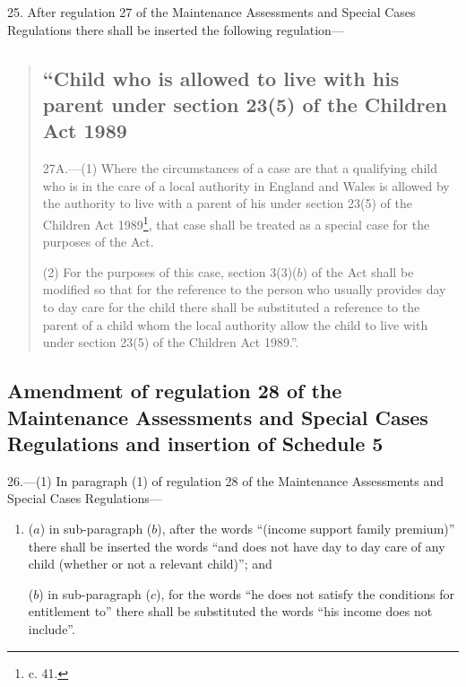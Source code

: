 \documentclass[a4paper]{article}
\begin{document}
25.  After regulation 27 of the Maintenance Assessments and Special Cases Regulations there shall be inserted the following regulation---
\begin{quotation}
\subsection*{“Child who is allowed to live with his parent under section 23(5) of the Children Act 1989}

27A.—(1) Where the circumstances of a case are that a qualifying child who is in the care of a local authority in England and Wales is allowed by the authority to live with a parent of his under section 23(5) of the Children Act 1989\footnote{ c. 41.}, that case shall be treated as a special case for the purposes of the Act.

(2) For the purposes of this case, section 3(3)($b$) of the Act shall be modified so that for the reference to the person who usually provides day to day care for the child there shall be substituted a reference to the parent of a child whom the local authority allow the child to live with under section 23(5) of the Children Act 1989.”.
\end{quotation}

\subsection[26. Amendment of regulation 28 of the Maintenance Assessments and Special Cases Regulations and insertion of Schedule 5]{Amendment of regulation 28 of the Maintenance Assessments and Special Cases Regulations and insertion of Schedule 5}

26.—(1) In paragraph (1) of regulation 28 of the Maintenance Assessments and Special Cases Regulations---
\begin{enumerate}\item[]
($a$) in sub-paragraph ($b$), after the words “(income support family premium)” there shall be inserted the words “and does not have day to day care of any child (whether or not a relevant child)”; and

($b$) in sub-paragraph ($c$), for the words “he does not satisfy the conditions for entitlement to” there shall be substituted the words “his income does not include”.
\end{enumerate}
\end{document}
